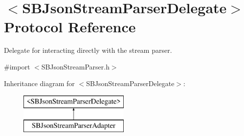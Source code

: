 \hypertarget{protocol_s_b_json_stream_parser_delegate-p}{\section{$<$S\-B\-Json\-Stream\-Parser\-Delegate$>$ Protocol Reference}
\label{protocol_s_b_json_stream_parser_delegate-p}
}


Delegate for interacting directly with the stream parser.  




{\ttfamily \#import $<$S\-B\-Json\-Stream\-Parser.\-h$>$}

Inheritance diagram for $<$S\-B\-Json\-Stream\-Parser\-Delegate$>$\-:\begin{figure}[H]
\begin{center}
\leavevmode
\includegraphics[height=2.000000cm]{protocol_s_b_json_stream_parser_delegate-p}
\end{center}
\end{figure}

